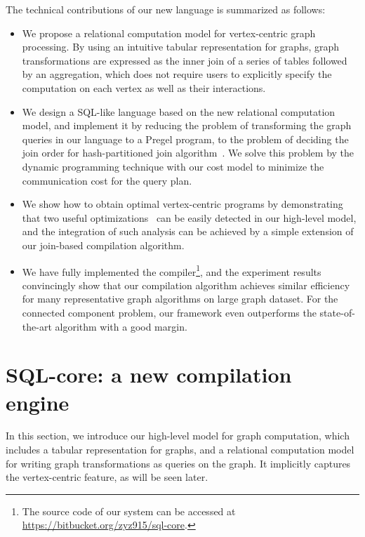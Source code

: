 \documentclass{sokendai_thesis} %
\begin{document}
The technical contributions of our new language is summarized as follows:
\begin{itemize}
  \item
    We propose a relational computation model for vertex-centric graph processing.
    By using an intuitive tabular representation for graphs, graph transformations are expressed as the inner join of a series of tables followed by an aggregation, which does not require users to explicitly specify the computation on each vertex as well as their interactions.
  \item
    We design a SQL-like language based on the new relational computation model, and implement it by reducing the problem of transforming the graph queries in our language to a Pregel program, to the problem of deciding the join order for hash-partitioned join algorithm~\cite{hashjoin-mp}.
    We solve this problem by the dynamic programming technique with our cost model to minimize the communication cost for the query plan.
  \item
    We show how to obtain optimal vertex-centric programs by demonstrating that two useful optimizations~\cite{yan2015effective,zhang2019composing} can be easily detected in our high-level model, and the integration of such analysis can be achieved by a simple extension of our join-based compilation algorithm.
  \item
    We have fully implemented the compiler\footnote{The source code of our system can be accessed at \url{https://bitbucket.org/zyz915/sql-core}.}, and the experiment results convincingly show that our compilation algorithm achieves similar efficiency for many representative graph algorithms on large graph dataset.
    For the connected component problem, our framework even outperforms the state-of-the-art algorithm with a good margin.
\end{itemize}

\section{SQL-core: a new compilation engine}

In this section, we introduce our high-level model for graph computation, which includes a tabular representation for graphs, and a relational computation model for writing graph transformations as queries on the graph.
It implicitly captures the vertex-centric feature, as will be seen later.
\end{document}
